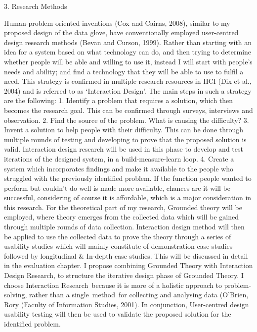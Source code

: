3. Research Methods

Human-problem oriented inventions (Cox and Cairns, 2008), similar to my proposed design of the data glove, have conventionally employed user-centred design research methods (Bevan and Curson, 1999). Rather than starting with an idea for a system based on what technology can do, and then trying to determine whether people will be able and willing to use it, instead I will start with people's needs and ability; and find a technology that they will be able to use to fulfil a need. This strategy is confirmed in multiple research resources in HCI (Dix et al., 2004) and is referred to as ‘Interaction Design’.    
The main steps in such a strategy are the following: 
1.	Identify a problem that requires a solution, which then becomes the research goal.  This can be confirmed through surveys, interviews and observation. 
2.	Find the source of the problem. What is causing the difficulty?
3.	Invent a solution to help people with their difficulty. This can be done through multiple rounds of testing and developing to prove that the proposed solution is valid. Interaction design research will be used in this phase to develop and test iterations of the designed system, in a build-measure-learn loop.
4.	Create a system which incorporates findings and make it available to the people who struggled with the previously identified problem. If the function people wanted to perform but couldn't do well is made more available, chances are it will be successful, considering of course it is affordable, which is a major consideration in this research. 
For the theoretical part of my research, Grounded theory will be employed, where theory emerges from the collected data which will be gained through multiple rounds of data collection.  Interaction design method will then be applied to use the collected data to prove the theory through a series of usability studies which will mainly constitute of demonstration case studies followed by longitudinal & In-depth case studies. This will be discussed in detail in the evaluation chapter.
I propose combining Grounded Theory with Interaction Design Research, to structure the iterative design phase of Grounded Theory.  I choose Interaction Research because it is more of a holistic approach to problem-solving, rather than a single method for collecting and analysing data (O’Brien, Rory (Faculty of Information Studies, 2001). In conjunction, User-centred design usability testing will then be used to validate the proposed solution for the identified problem. 

